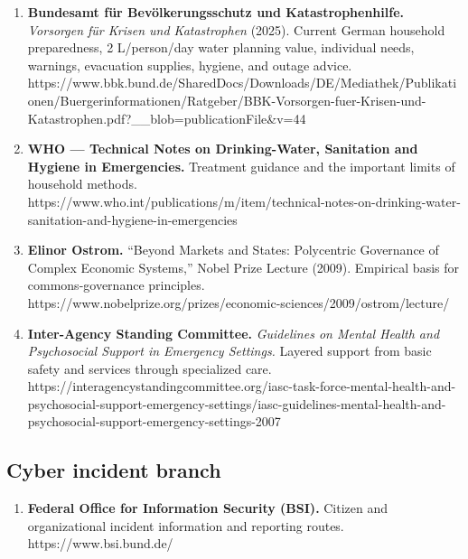 \begin{enumerate}
\def\labelenumi{\arabic{enumi}.}
\setcounter{enumi}{20}
\item
  \textbf{Bundesamt für Bevölkerungsschutz und Katastrophenhilfe.}
  \emph{Vorsorgen für Krisen und Katastrophen} (2025). Current German
  household preparedness, 2 L/person/day water planning value,
  individual needs, warnings, evacuation supplies, hygiene, and outage
  advice.\\
  https://www.bbk.bund.de/SharedDocs/Downloads/DE/Mediathek/Publikationen/Buergerinformationen/Ratgeber/BBK-Vorsorgen-fuer-Krisen-und-Katastrophen.pdf?\_\_blob=publicationFile\&v=44
\item
  \textbf{WHO --- Technical Notes on Drinking-Water, Sanitation and
  Hygiene in Emergencies.} Treatment guidance and the important limits
  of household methods.\\
  https://www.who.int/publications/m/item/technical-notes-on-drinking-water-sanitation-and-hygiene-in-emergencies
\item
  \textbf{Elinor Ostrom.} ``Beyond Markets and States: Polycentric
  Governance of Complex Economic Systems,'' Nobel Prize Lecture (2009).
  Empirical basis for commons-governance principles.\\
  https://www.nobelprize.org/prizes/economic-sciences/2009/ostrom/lecture/
\item
  \textbf{Inter-Agency Standing Committee.} \emph{Guidelines on Mental
  Health and Psychosocial Support in Emergency Settings.} Layered
  support from basic safety and services through specialized care.\\
  https://interagencystandingcommittee.org/iasc-task-force-mental-health-and-psychosocial-support-emergency-settings/iasc-guidelines-mental-health-and-psychosocial-support-emergency-settings-2007
\end{enumerate}

\hypertarget{cyber-incident-branch}{%
\subsection{Cyber incident branch}\label{cyber-incident-branch}}

\begin{enumerate}
\def\labelenumi{\arabic{enumi}.}
\setcounter{enumi}{24}
\tightlist
\item
  \textbf{Federal Office for Information Security (BSI).} Citizen and
  organizational incident information and reporting routes.\\
  https://www.bsi.bund.de/
\end{enumerate}

